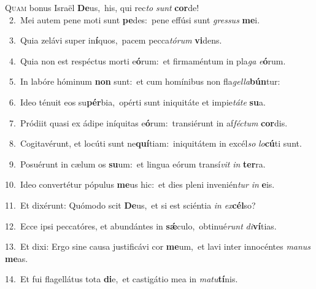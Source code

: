 \lettrine{\initial\textcolor{\initialcolor}{Q}}{uam} bonus Israël \textbf{De}\-us,~\star his, qui rec\textit{to} \textit{sunt} \textbf{cor}\-de!\\
{\numbfont\textcolor{\numbcolor}{~2.}}~Mei autem pene moti sunt \textbf{pe}\-des:~\star pene effúsi sunt \textit{gres}\-\textit{sus} \textbf{me}\-i.\par
{\numbfont\textcolor{\numbcolor}{~3.}}~Quia zelávi super in\-\textbf{í}\-quos,~\star pacem pecca\-\textit{tó}\-\textit{rum} \textbf{vi}\-dens.\par
{\numbfont\textcolor{\numbcolor}{~4.}}~Quia non est respéctus morti e\-\textbf{ó}\-rum:~\star et firmaméntum in pla\textit{ga} \textit{e}\-\textbf{ó}rum.\par
{\numbfont\textcolor{\numbcolor}{~5.}}~In labóre hóminum \textbf{non} sunt:~\star et cum homínibus non fla\-\textit{gel}\-\textit{la}\textbf{bún}tur:\par
{\numbfont\textcolor{\numbcolor}{~6.}}~Ideo ténuit eos su\-\textbf{pér}\-bia,~\star opérti sunt iniquitáte et impie\-\textit{tá}\-\textit{te} \textbf{su}\-a.\par
{\numbfont\textcolor{\numbcolor}{~7.}}~Pródiit quasi ex ádipe iníquitas e\-\textbf{ó}\-rum:~\star transiérunt in af\-\textit{féc}\-\textit{tum} \textbf{cor}\-dis.\par
{\numbfont\textcolor{\numbcolor}{~8.}}~Cogitavérunt, et locúti sunt ne\-\textbf{quí}\-tiam:~\star iniquitátem in excél\textit{so} \textit{lo}\-\textbf{cú}ti sunt.\par
{\numbfont\textcolor{\numbcolor}{~9.}}~Posuérunt in cælum os \textbf{su}\-um:~\star et lingua eórum transí\textit{vit} \textit{in} \textbf{ter}\-ra.\par
{\numbfont\textcolor{\numbcolor}{10.}}~Ideo convertétur pópulus \textbf{me}\-us hic:~\star et dies pleni invenién\textit{tur} \textit{in} \textbf{e}\-is.\par
{\numbfont\textcolor{\numbcolor}{11.}}~Et dixérunt: Quómodo scit \textbf{De}\-us,~\star et si est sciéntia \textit{in} \textit{ex}\-\textbf{cél}so?\par
{\numbfont\textcolor{\numbcolor}{12.}}~Ecce ipsi peccatóres, et abundántes in \textbf{sǽ}\-culo,~\star obtinué\textit{runt} \textit{di}\-\textbf{ví}tias.\par
{\numbfont\textcolor{\numbcolor}{13.}}~Et dixi: Ergo sine causa justificávi cor \textbf{me}\-um,~\star et lavi inter innocéntes \textit{ma}\-\textit{nus} \textbf{me}\-as.\par
{\numbfont\textcolor{\numbcolor}{14.}}~Et fui flagellátus tota \textbf{di}\-e,~\star et castigátio mea in \textit{ma}\-\textit{tu}\textbf{tí}nis.\par
